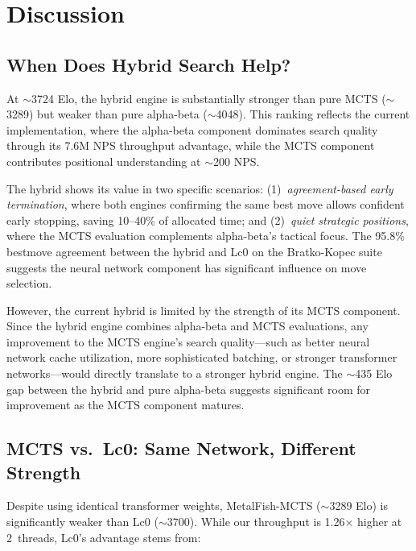 \documentclass{svproc}
\begin{document}

\FloatBarrier
\section{Discussion}
\label{sec:discussion}

\subsection{When Does Hybrid Search Help?}

At $\sim$3724 Elo, the hybrid engine is substantially stronger than pure MCTS ($\sim$3289) but weaker than pure alpha-beta ($\sim$4048). This ranking reflects the current implementation, where the alpha-beta component dominates search quality through its 7.6M NPS throughput advantage, while the MCTS component contributes positional understanding at $\sim$200 NPS.

The hybrid shows its value in two specific scenarios: (1)~\emph{agreement-based early termination}, where both engines confirming the same best move allows confident early stopping, saving 10--40\% of allocated time; and (2)~\emph{quiet strategic positions}, where the MCTS evaluation complements alpha-beta's tactical focus. The 95.8\% bestmove agreement between the hybrid and Lc0 on the Bratko-Kopec suite suggests the neural network component has significant influence on move selection.

However, the current hybrid is limited by the strength of its MCTS component. Since the hybrid engine combines alpha-beta and MCTS evaluations, any improvement to the MCTS engine's search quality---such as better neural network cache utilization, more sophisticated batching, or stronger transformer networks---would directly translate to a stronger hybrid engine. The $\sim$435 Elo gap between the hybrid and pure alpha-beta suggests significant room for improvement as the MCTS component matures.

\subsection{MCTS vs.\ Lc0: Same Network, Different Strength}

Despite using identical transformer weights, MetalFish-MCTS ($\sim$3289 Elo) is significantly weaker than Lc0 ($\sim$3700). While our throughput is 1.26$\times$ higher at 2~threads, Lc0's advantage stems from:
\end{document}
